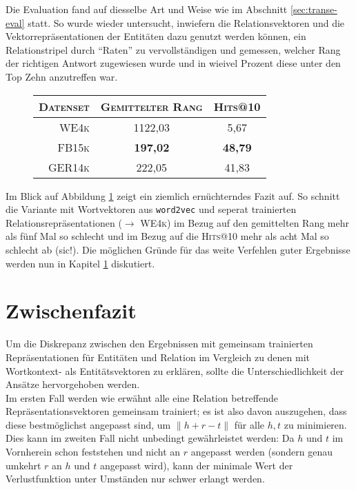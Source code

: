 Die Evaluation fand auf diesselbe Art und Weise wie im Abschnitt \ref{sec:transe-eval} statt. So wurde wieder untersucht,
inwiefern die Relationsvektoren und die Vektorrepräsentationen der Entitäten dazu genutzt werden können, ein Relationstripel
durch ``Raten'' zu vervollständigen und gemessen, welcher Rang der richtigen Antwort zugewiesen wurde und in wieivel Prozent
diese unter den Top Zehn anzutreffen war.

\begin{figure}[h]
  \centering
  \begin{tabular}{r||c|c}
    \textsc{Datenset} & \textsc{Gemittelter Rang} & \textsc{Hits@10} \\
     \hline
     \textsc{WE4k} & 1122,03 & 5,67 \\
     \textsc{FB15k} & \textbf{197,02} & \textbf{48,79} \\
     \textsc{GER14k} & 222,05 & 41,83 \\
  \end{tabular}
  \caption[Resultate auf mit Wordvektoren auf \textsc{WE3k}]{\label{fig:eval-we4k}}
\end{figure}

Im Blick auf Abbildung \ref{fig:eval-we4k} zeigt ein ziemlich ernüchterndes Fazit auf. So schnitt die Variante
mit Wortvektoren aus \verb|word2vec| und seperat trainierten Relationsrepräsentationen ($\rightarrow$ \textsc{WE4k}) im Bezug auf
den gemittelten Rang mehr als fünf Mal so schlecht und im Bezug auf die \textsc{Hits@10} mehr als acht Mal so schlecht ab (sic!).
Die möglichen Gründe für das weite Verfehlen guter Ergebnisse werden nun in Kapitel \ref{sec:we4k-zwifa} diskutiert.

\section{Zwischenfazit}\label{sec:we4k-zwifa}

Um die Diskrepanz zwischen den Ergebnissen mit gemeinsam trainierten Repräsentationen für Entitäten und Relation im Vergleich
zu denen mit Wortkontext- als Entitätsvektoren zu erklären, sollte die Unterschiedlichkeit der Ansätze hervorgehoben
werden.\\

Im ersten Fall werden wie erwähnt alle eine Relation betreffende Repräsentationsvektoren gemeinsam trainiert; es ist
also davon auszugehen, dass diese bestmöglichst angepasst sind, um $\parallel h + r - t\parallel$ für alle $h, t$ zu minimieren.\\
Dies kann im zweiten Fall nicht unbedingt gewährleistet werden: Da $h$ und $t$ im Vornherein schon feststehen und nicht
an $r$ angepasst werden (sondern genau umkehrt $r$ an $h$ und $t$ angepasst wird), kann der minimale Wert der Verlustfunktion
unter Umständen nur schwer erlangt werden.\\

